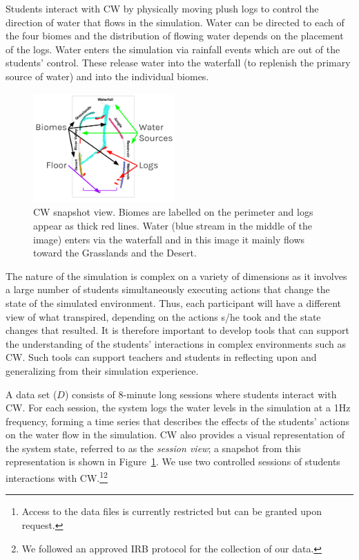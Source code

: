 \documentclass[letterpaper]{article}
\begin{document}
Students interact with CW by physically moving plush logs to control the direction of water that flows in the simulation. Water can be directed to each of the four biomes and the distribution of flowing water depends on the placement of the logs. Water enters the simulation via rainfall events which are out of the students' control. These release water into the waterfall (to replenish the primary source of water) and into the individual biomes.

\begin{figure}[t]
\centering
\includegraphics[width=0.48\textwidth]{./images/cw_snapshot.png}
\caption{CW snapshot view. Biomes are labelled on the perimeter and logs appear as thick red lines. Water (blue stream in the middle of the image) enters via the waterfall and in this image it mainly flows toward the Grasslands and the Desert.}
\label{fig:connected_worlds_graphic}
\end{figure}

The nature of the simulation is complex on a variety of dimensions as it involves a large number of students simultaneously executing actions that change the state of the simulated environment. Thus, each participant will have a different view of what transpired, depending on the actions s/he took and the state changes that resulted.
It is therefore important to develop tools that can support  the understanding of the students' interactions in complex environments such as CW.
Such tools can  support teachers and students in reflecting upon and generalizing from their simulation experience.

A data set ($D$) consists of 8-minute long sessions where students interact with CW.
For each session, the system logs the water levels in the simulation at a 1Hz frequency, forming a time series that describes the effects of the students' actions on the water flow in the simulation.
CW also provides
a visual representation of the system state, referred to as the \emph{session view}; a snapshot from this representation is shown in Figure~\ref{fig:connected_worlds_graphic}.
We use two controlled sessions of students interactions with CW.\footnote{Access to the data files is currently restricted but can be granted upon request.}\footnote{We followed an approved IRB protocol for the collection of our data.}
\end{document}
